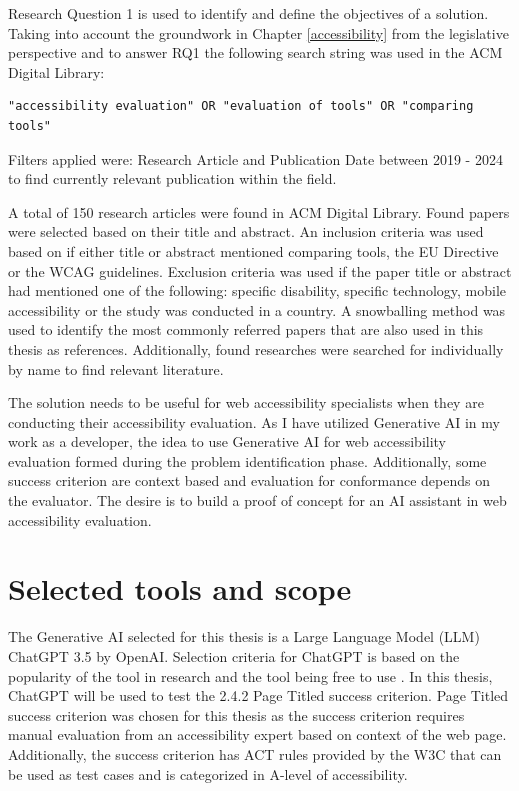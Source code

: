 Research Question 1 is used to identify and define the objectives of a solution. Taking into account the groundwork in Chapter \ref{accessibility} from the legislative perspective and to answer RQ1 the following search string was used in the ACM Digital Library:

\begin{verbatim}
"accessibility evaluation" OR "evaluation of tools" OR "comparing tools"
\end{verbatim}

Filters applied were: Research Article and Publication Date between 2019 - 2024 to find currently relevant publication within the field. 

A total of 150 research articles were found in ACM Digital Library. Found papers were selected based on their title and abstract. An inclusion criteria was used based on if either title or abstract mentioned comparing tools, the EU Directive or the WCAG guidelines. Exclusion criteria was used if the paper title or abstract had mentioned one of the following: specific disability, specific technology, mobile accessibility or the study was conducted in a country. A snowballing method was used to identify the most commonly referred papers that are also used in this thesis as references. Additionally, found researches were searched for individually by name to find relevant literature.

The solution needs to be useful for web accessibility specialists when they are conducting their accessibility evaluation. As I have utilized Generative AI in my work as a developer, the idea to use Generative AI for web accessibility evaluation formed during the problem identification phase. Additionally, some success criterion are context based and evaluation for conformance depends on the evaluator. The desire is to build a proof of concept for an AI assistant in web accessibility evaluation.

\section{Selected tools and scope}

The Generative AI selected for this thesis is a Large Language Model (LLM) ChatGPT 3.5 by OpenAI. Selection criteria for ChatGPT is based on the popularity of the tool in research and the tool being free to use \citep{ouyang2023llm, white2023prompt}. In this thesis, ChatGPT will be used to test the 2.4.2 Page Titled success criterion. Page Titled success criterion was chosen for this thesis as the success criterion requires manual evaluation from an accessibility expert based on context of the web page. Additionally, the success criterion has ACT rules provided by the W3C that can be used as test cases and is categorized in A-level of accessibility. 

